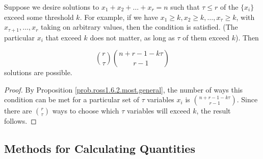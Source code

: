 \begin{proposition}\label{prob.ross1.6.2.numer} Suppose we desire solutions to \(x_1 + x_2 + \ldots + x_r = n\) such that \(\tau \leq r\) of the \(\{x_i\}\) exceed some threshold \(k\). For example, if we have \(x_1 \geq k, x_2 \geq k, \ldots, x_\tau \geq k\), with \(x_{\tau + 1}, \ldots, x_r\) taking on arbitrary values, then the condition is satisfied. (The particular \(x_i\) that exceed \(k\) does not matter, as long as \(\tau\) of them exceed \(k\)). Then

\[
\binom{r}{\tau}\binom{n + r - 1 - k \tau}{r-1}
\] solutions are possible.

\begin{proof}
By Proposition \ref{prob.ross1.6.2.most.general}, the number of ways this condition can be met for a particular set of \(\tau\) variables \(x_i\) is \(\binom{n + r - 1 - k \tau}{r-1}\). Since there are \(\binom{r}{\tau}\) ways to choose which \(\tau\) variables will exceed \(k\), the result follows.
\end{proof}

\end{proposition}

\subsection{Methods for Calculating Quantities}

